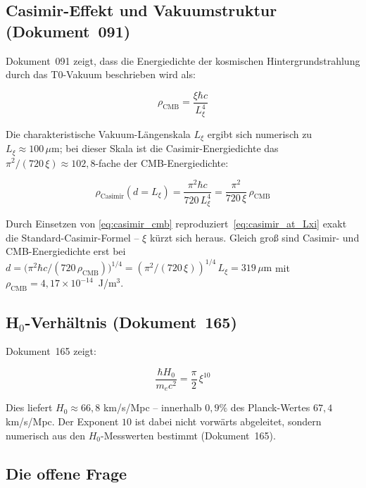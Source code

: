 \subsection{Casimir-Effekt und Vakuumstruktur (Dokument~091)}

Dokument~091 zeigt, dass die Energiedichte der kosmischen Hintergrundstrahlung
durch das T0-Vakuum beschrieben wird als:

\begin{equation}
    \rho_\text{CMB} = \frac{\xi \hbar c}{L_\xi^4}
    \label{eq:casimir_cmb}
\end{equation}

Die charakteristische Vakuum-Längenskala $L_\xi$ ergibt sich numerisch zu
$L_\xi \approx 100\,\mu\text{m}$; bei dieser Skala ist die Casimir-Energiedichte
das $\pi^2/(720\,\xi) \approx 102{,}8$-fache der CMB-Energiedichte:

\begin{equation}
    \rho_\text{Casimir}(d = L_\xi)
    = \frac{\pi^2 \hbar c}{720\,L_\xi^4}
    = \frac{\pi^2}{720\,\xi}\,\rho_\text{CMB}
    \label{eq:casimir_at_Lxi}
\end{equation}

Durch Einsetzen von \eqref{eq:casimir_cmb} reproduziert~\eqref{eq:casimir_at_Lxi}
exakt die Standard-Casimir-Formel -- $\xi$ kürzt sich heraus. Gleich groß sind
Casimir- und CMB-Energiedichte erst bei
$d = \bigl(\pi^2\hbar c/(720\,\rho_\text{CMB})\bigr)^{1/4} = (\pi^2/(720\,\xi))^{1/4}\,L_\xi = 319\,\mu\text{m}$
mit $\rho_\text{CMB} = 4{,}17\times10^{-14}$~J/m$^3$.

\subsection{H\texorpdfstring{$_0$}{0}-Verhältnis (Dokument~165)}

Dokument~165 zeigt:

\begin{equation}
    \frac{\hbar H_0}{m_e c^2} = \frac{\pi}{2}\,\xi^{10}
    \label{eq:h0_ratio}
\end{equation}

Dies liefert $H_0 \approx 66{,}8$ km/s/Mpc -- innerhalb $0{,}9\%$ des
Planck-Wertes $67{,}4$ km/s/Mpc. Der Exponent $10$ ist dabei nicht vorwärts
abgeleitet, sondern numerisch aus den $H_0$-Messwerten bestimmt (Dokument~165).

\subsection{Die offene Frage}

